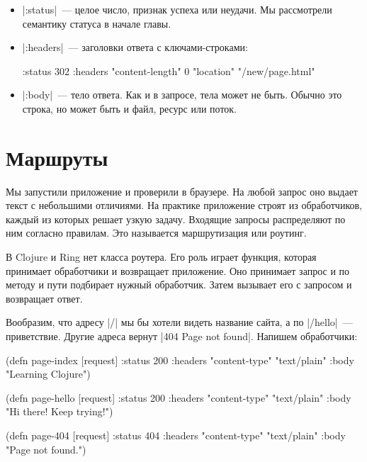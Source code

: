 \begin{itemize}

\item
  \spverb|:status|~--- целое число, признак успеха или неудачи. Мы рассмотрели
  семантику статуса в начале главы.

\item
  \spverb|:headers|~--- заголовки ответа с ключами-строками:

\begin{english}
  \begin{clojure}
{:status 302
 :headers {"content-length" 0
           "location" "/new/page.html"}}
  \end{clojure}
\end{english}

\item
  \spverb|:body|~--- тело ответа. Как и в запросе, тела может не быть. Обычно
  это строка, но может быть и файл, ресурс или поток.

\end{itemize}

\section{Маршруты}

Мы запустили приложение и проверили в браузере. На любой запрос оно выдает текст
с небольшими отличиями. На практике приложение строят из обработчиков, каждый из
которых решает узкую задачу. Входящие запросы распределяют по ним согласно
правилам. Это называется маршрутизация или роутинг.

В Clojure и Ring нет класса роутера. Его роль играет функция, которая принимает
обработчики и возвращает приложение. Оно принимает запрос и по методу и пути
подбирает нужный обработчик. Затем вызывает его с запросом и возвращает ответ.

Вообразим, что адресу \spverb|/| мы бы хотели видеть название сайта, а по
\spverb|/hello|~--- приветствие. Другие адреса вернут \spverb|404 Page not found|.
Напишем обработчики:

\begin{english}
  \begin{clojure}
(defn page-index [request]
  {:status 200
   :headers {"content-type" "text/plain"}
   :body "Learning Clojure"})

(defn page-hello [request]
  {:status 200
   :headers {"content-type" "text/plain"}
   :body "Hi there! Keep trying!"})

(defn page-404 [request]
  {:status 404
   :headers {"content-type" "text/plain"}
   :body "Page not found."})
  \end{clojure}
\end{english}

